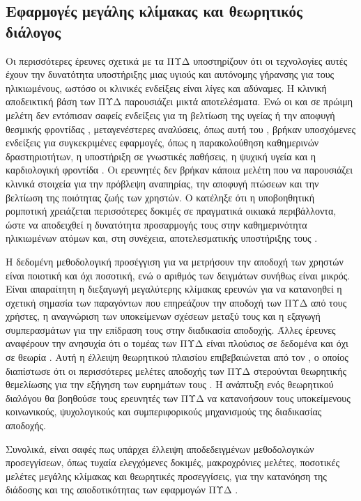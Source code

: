\subsection{Εφαρμογές μεγάλης κλίμακας και θεωρητικός διάλογος}
Οι περισσότερες έρευνες σχετικά με τα ΠΥΔ υποστηρίζουν ότι οι τεχνολογίες αυτές έχουν την δυνατότητα υποστήριξης μιας υγιούς και αυτόνομης γήρανσης για τους ηλικιωμένους, ωστόσο οι κλινικές ενδείξεις είναι λίγες και αδύναμες.
Η κλινική αποδεικτική βάση των ΠΥΔ παρουσιάζει μικτά αποτελέσματα. Ενώ οι  και  σε πρώιμη μελέτη δεν εντόπισαν σαφείς ενδείξεις για τη βελτίωση της υγείας ή την αποφυγή θεσμικής φροντίδας \cite{Demiris2008}, μεταγενέστερες αναλύσεις, όπως αυτή του , βρήκαν υποσχόμενες ενδείξεις για συγκεκριμένες εφαρμογές, όπως η παρακολούθηση καθημερινών δραστηριοτήτων, η υποστήριξη σε γνωστικές παθήσεις, η ψυχική υγεία και η καρδιολογική φροντίδα \cite{Liu2016}.
Οι ερευνητές δεν βρήκαν κάποια μελέτη που να παρουσιάζει κλινικά στοιχεία για την πρόβλεψη αναπηρίας, την αποφυγή πτώσεων και την βελτίωση της ποιότητας ζωής των χρηστών.
Ο  κατέληξε ότι η υποβοηθητική ρομποτική χρειάζεται περισσότερες δοκιμές σε πραγματικά οικιακά περιβάλλοντα, ώστε να αποδειχθεί η δυνατότητα προσαρμογής τους στην καθημερινότητα ηλικιωμένων ατόμων και, στη συνέχεια, αποτελεσματικής υποστήριξης τους \cite{Robinson2014}.
\par
Η δεδομένη μεθοδολογική προσέγγιση για να μετρήσουν την αποδοχή των χρηστών είναι ποιοτική και όχι ποσοτική, ενώ ο αριθμός των δειγμάτων συνήθως είναι μικρός.
Είναι απαραίτητη η διεξαγωγή μεγαλύτερης κλίμακας ερευνών για να κατανοηθεί η σχετική σημασία των παραγόντων που επηρεάζουν την αποδοχή των ΠΥΔ από τους χρήστες, η αναγνώριση των υποκείμενων σχέσεων μεταξύ τους και η εξαγωγή συμπερασμάτων για την επίδραση τους στην διαδικασία αποδοχής.
Άλλες έρευνες αναφέρουν την ανησυχία ότι ο τομέας των ΠΥΔ είναι πλούσιος σε δεδομένα και όχι σε θεωρία \cite{Blackman2016}.
Αυτή η έλλειψη θεωρητικού πλαισίου επιβεβαιώνεται από τον , ο οποίος διαπίστωσε ότι οι περισσότερες μελέτες αποδοχής των ΠΥΔ στερούνται θεωρητικής θεμελίωσης για την εξήγηση των ευρημάτων τους \cite{Liu2016}.
Η ανάπτυξη ενός θεωρητικού διαλόγου θα βοηθούσε τους ερευνητές των ΠΥΔ να κατανοήσουν τους υποκείμενους κοινωνικούς, ψυχολογικούς και συμπεριφορικούς μηχανισμούς της διαδικασίας αποδοχής.
\par
Συνολικά, είναι σαφές πως υπάρχει έλλειψη αποδεδειγμένων μεθοδολογικών προσεγγίσεων, όπως τυχαία ελεγχόμενες δοκιμές, μακροχρόνιες μελέτες, ποσοτικές μελέτες μεγάλης κλίμακας και θεωρητικές προσεγγίσεις, για την κατανόηση της διάδοσης και της αποδοτικότητας των εφαρμογών ΠΥΔ \cite{Martin2008}\cite{Morris2013}\cite{Peek2014}.